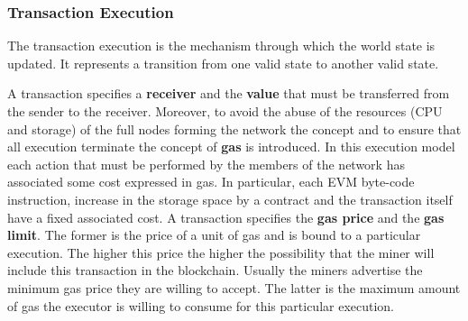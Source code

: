\subsubsection{Transaction Execution}
\label{sec:tx-execution}

The transaction execution is the mechanism through which the world state is
updated. It represents a transition from one valid state to another valid state.

A transaction specifies a \textbf{receiver} and the \textbf{value} that must be
transferred from the sender to the receiver.
Moreover, to avoid the abuse of the resources
(CPU and storage) of the full nodes forming the network the concept and to
ensure that all execution terminate the concept of \textbf{gas} is introduced.
In this execution model each action that must be performed by the members
of the network has associated some cost expressed in gas.
In particular, each EVM byte-code instruction, increase in the storage
space by a contract and the transaction itself have a fixed associated cost.
A transaction specifies the \textbf{gas price} and the \textbf{gas limit}.
The former is the price of a unit of gas and is bound to a particular execution.
The higher this price the higher the
possibility that the miner will include this transaction in the blockchain.
Usually the miners advertise the minimum gas price they are willing to accept.
The latter is the maximum amount of gas the executor is willing to consume for
this particular execution.

